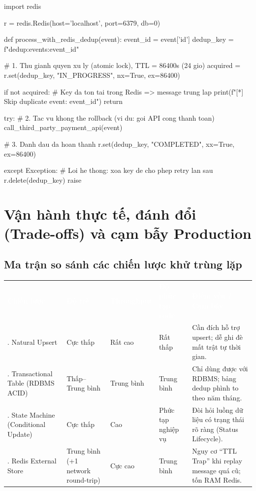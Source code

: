 \documentclass[12pt]{article}
\begin{document}
\begin{aivnpybox}
import redis

r = redis.Redis(host='localhost', port=6379, db=0)

def process_with_redis_dedup(event):
    event_id = event['id']
    dedup_key = f"dedup:events:{event_id}"

    # 1. Thu gianh quyen xu ly (atomic lock), TTL = 86400s (24 gio)
    acquired = r.set(dedup_key, "IN_PROGRESS", nx=True, ex=86400)

    if not acquired:
        # Key da ton tai trong Redis => message trung lap
        print(f"[*] Skip duplicate event: {event_id}")
        return

    try:
        # 2. Tac vu khong the rollback (vi du: goi API cong thanh toan)
        call_third_party_payment_api(event)

        # 3. Danh dau da hoan thanh
        r.set(dedup_key, "COMPLETED", xx=True, ex=86400)

    except Exception:
        # Loi he thong: xoa key de cho phep retry lan sau
        r.delete(dedup_key)
        raise
\end{aivnpybox}

\section{Vận hành thực tế, đánh đổi (Trade-offs) và cạm bẫy Production}

\subsection{Ma trận so sánh các chiến lược khử trùng lặp}

\begin{table}[H]
\centering
\small
{}
\begin{tabularx}{\textwidth}{@{}>{\RaggedRight\arraybackslash}p{3.1cm}>{\RaggedRight\arraybackslash}p{2.2cm}>{\RaggedRight\arraybackslash}p{2.1cm}>{\RaggedRight\arraybackslash}p{2.3cm}>{\RaggedRight\arraybackslash}X@{}}
\rowcolor{aivnGreen}
\textcolor{white}{\textbf{Chiến lược}} & \textcolor{white}{\textbf{Độ trễ}} & \textcolor{white}{\textbf{Throughput}} & \textcolor{white}{\textbf{Độ phức tạp code}} & \textcolor{white}{\textbf{Điểm yếu / Cạm bẫy}} \\
1. Natural Upsert & Cực thấp & Rất cao & Rất thấp & Cần đích hỗ trợ upsert; dễ ghi đè mất trật tự thời gian. \\
2. Transactional Table (RDBMS ACID) & Thấp--Trung bình & Trung bình & Trung bình & Chỉ dùng được với RDBMS; bảng dedup phình to theo năm tháng. \\
3. State Machine (Conditional Update) & Cực thấp & Cao & Phức tạp nghiệp vụ & Đòi hỏi luồng dữ liệu có trạng thái rõ ràng (Status Lifecycle). \\
4. Redis External Store & Trung bình (+1 network round-trip) & Cực cao & Trung bình & Nguy cơ ``TTL Trap'' khi replay message quá cũ; tốn RAM Redis. \\
\end{tabularx}
\end{table}
\end{document}
